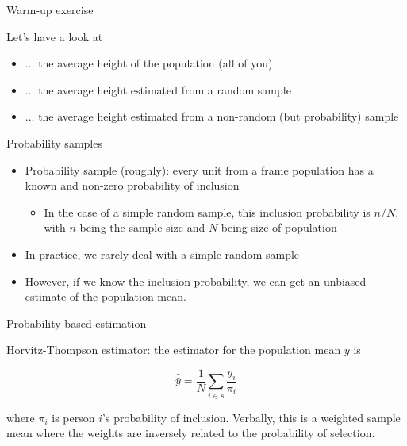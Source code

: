 \documentclass[aspectratio=169]{beamer}
\begin{document}
\begin{frame}{Warm-up exercise}

Let's have a look at 

\begin{itemize}
    \item ... the average height of the population (all of you)
    \item ... the average height estimated from a random sample
    \item ... the average height estimated from a non-random (but probability) sample
\end{itemize}

\end{frame}

\begin{frame}{Probability samples}

\begin{itemize}
\item Probability sample (roughly): every unit from a frame population has a known and non-zero probability of inclusion
\pause
\begin{itemize}
\item In the case of a simple random sample, this inclusion probability is $n/N$, with $n$ being the sample size and $N$ being size of population
\end{itemize}
\pause
\item In practice, we rarely deal with a simple random sample
\item However, if we know the inclusion probability, we can get an unbiased estimate of the population mean.
\end{itemize}

\end{frame}

\begin{frame}{Probability-based estimation}

Horvitz-Thompson estimator: the estimator for the population mean $\bar{y}$ is

$$\hat{\bar{y}} = \frac{1}{N}\sum_{i \in s}\frac{y_i}{\pi_i}$$

where $\pi_i$ is person $i$'s probability of inclusion. Verbally, this is a weighted sample mean where the weights are inversely related to the probability of selection.

\end{frame}
\end{document}
